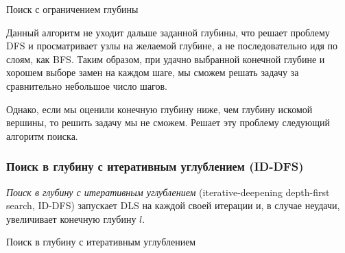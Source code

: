 \begin{algorithm}[H]
\SetAlgoLined
{}

\caption{Поиск с ограничением глубины}  \label{algo:DLS}
\end{algorithm}

Данный алгоритм не уходит дальше заданной глубины, что решает проблему DFS и просматривает узлы на желаемой глубине, а не последовательно идя по слоям, как BFS. Таким образом, при удачно выбранной конечной глубине и хорошем выборе замен на каждом шаге, мы сможем решать задачу за сравнительно небольшое число шагов.

Однако, если мы оценили конечную глубину ниже, чем глубину искомой вершины, то решить задачу мы не сможем. Решает эту проблему следующий алгоритм поиска. 

\subsubsection{Поиск в глубину с итеративным углублением (ID-DFS)} \label{sec:ID-DFS}

\begin{definition}
    \textit{Поиск в глубину с итеративным углублением} (iterative-deepening depth-first search, ID-DFS) \cite{Korf-ID-DFS} запускает DLS на каждой своей итерации и, в случае неудачи, увеличивает конечную глубину $l$.
\end{definition}

\begin{algorithm}[H]
\SetAlgoLined
{}

\caption{Поиск в глубину с итеративным углублением} \label{algo:ID-DFS}
\end{algorithm}

